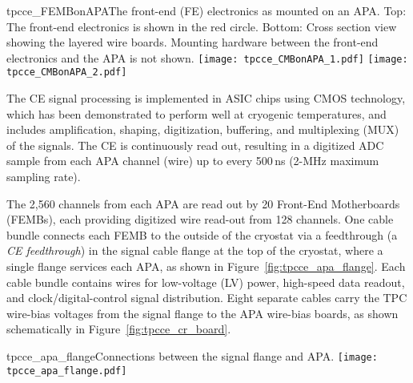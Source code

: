 \begin{cdrfigure}{tpcce_FEMBonAPA}{The 
front-end (FE) electronics as mounted on an APA.
  Top: The front-end electronics is shown in the red circle.
 Bottom: Cross section view showing the layered wire boards. Mounting hardware between the front-end electronics 
and the APA is not shown.}
\texttt{[image: tpcce\_CMBonAPA\_1.pdf]}
\texttt{[image: tpcce\_CMBonAPA\_2.pdf]}
\end{cdrfigure}

The CE signal processing is implemented in ASIC chips using CMOS technology,
which has been demonstrated to perform well at cryogenic temperatures,
and includes amplification, shaping, digitization, buffering, and multiplexing (MUX) of the signals.
The CE is continuously read out,
resulting in a digitized ADC sample from each APA channel (wire) up to every 500\,ns (2-MHz maximum sampling rate). 

The 2,560 channels from each APA are read out by 20 Front-End Motherboards (FEMBs), each providing 
digitized wire read-out from 128 channels. One cable bundle 
connects each FEMB to the outside of the cryostat via a feedthrough (a \textit{CE feedthrough}) in the signal cable flange at the top of the cryostat, where a single flange services each APA, as shown in Figure~\ref{fig:tpcce_apa_flange}. 
Each cable bundle contains wires for low-voltage (LV) power, high-speed data readout,
and clock/digital-control signal distribution.
Eight separate cables carry the TPC wire-bias voltages from the signal flange to the APA wire-bias boards, as
shown schematically in Figure~\ref{fig:tpcce_cr_board}.

\begin{cdrfigure}{tpcce_apa_flange}{Connections between
the signal flange and APA.}
\texttt{[image: tpcce\_apa\_flange.pdf]}
\end{cdrfigure}

